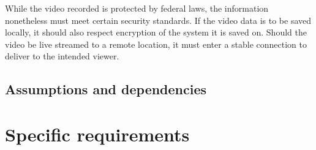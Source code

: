 \documentclass[letterpaper,10pt,onecolumn,draftclsnofoot]{IEEEtran}
\begin{document}
While the video recorded is protected by federal laws, the information nonetheless must meet certain security standards.
If the video data is to be saved locally, it should also respect encryption of the system it is saved on.
Should the video be live streamed to a remote location, it must enter a stable connection to deliver to the intended viewer.

\subsection{Assumptions and dependencies}

\section{Specific requirements}
\end{document}
